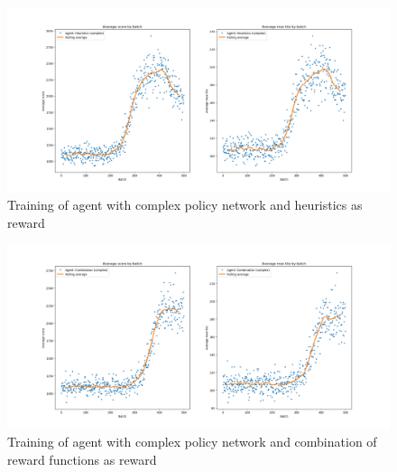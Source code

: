 \documentclass[11pt, fleqn]{article}
\begin{document}
\begin{figure}[H]
	\centering
	\includegraphics[width=\linewidth]{"train_heuristics_complex"}
	\caption{Training of agent with complex policy network and heuristics as reward}
\end{figure}

\begin{figure}[H]
	\centering
	\includegraphics[width=\linewidth]{"train_combination_complex"}
	\caption{Training of agent with complex policy network and combination of reward functions as reward}
\end{figure}
\end{document}
